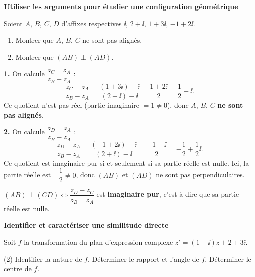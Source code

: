 
\exerciceresolu
\textbf{Utiliser les arguments pour étudier une configuration géométrique}

Soient $A$, $B$, $C$, $D$ d'affixes respectives $\ii$, $2+\ii$, $1+3\ii$, $-1+2\ii$.

\begin{enumerate}
	\item Montrer que $A$, $B$, $C$ ne sont pas alignés.
	\item Montrer que $(AB) \perp (AD)$.
\end{enumerate}

\solution

\textbf{1.} On calcule $\dfrac{z_C - z_A}{z_B - z_A}$ :
$$
\frac{z_C - z_A}{z_B - z_A}
= \frac{(1+3\ii) - \ii}{(2+\ii) - \ii}
= \frac{1 + 2\ii}{2}
= \frac{1}{2} + \ii.
$$
Ce quotient n'est pas réel (partie imaginaire $= 1 \neq 0$),
donc $A$, $B$, $C$ \textbf{ne sont pas alignés}.

\textbf{2.} On calcule $\dfrac{z_D - z_A}{z_B - z_A}$ :
$$
\frac{z_D - z_A}{z_B - z_A}
= \frac{(-1+2\ii) - \ii}{(2+\ii) - \ii}
= \frac{-1 + \ii}{2}
= -\frac{1}{2} + \frac{1}{2}\ii.
$$
Ce quotient est imaginaire pur si et seulement si sa partie réelle est nulle.
Ici, la partie réelle est $-\dfrac{1}{2} \neq 0$, donc $(AB)$ et $(AD)$ ne sont pas perpendiculaires.

\begin{attention}
	$(AB) \perp (CD) \iff \dfrac{z_D - z_C}{z_B - z_A}$ est \textbf{imaginaire pur},
	c'est-à-dire que sa partie réelle est nulle.
\end{attention}



\exerciceresolu
\textbf{Identifier et caractériser une similitude directe}

Soit $f$ la transformation du plan d'expression complexe $z' = (1-\ii)z + 2 + 3\ii$.

\begin{listecol}(2)
	\task Identifier la nature de $f$.
	\task Déterminer le rapport et l'angle de $f$.
	\task Déterminer le centre de $f$.
\end{listecol}

\solution

